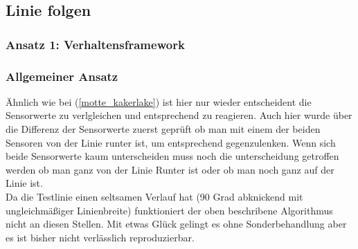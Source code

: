 \subsection{Linie folgen}
\label{linie_folgen}

\subsubsection{Ansatz 1: Verhaltensframework}

\subsubsection{Allgemeiner Ansatz}

Ähnlich wie bei  (\ref{motte_kakerlake})  ist hier nur wieder entscheident die Sensorwerte zu verlgleichen und entsprechend zu reagieren. Auch hier wurde über die Differenz der Sensorwerte zuerst geprüft ob man mit einem der beiden Sensoren von der Linie runter ist, um entsprechend gegenzulenken. Wenn sich beide Sensorwerte kaum unterscheiden muss noch die unterscheidung getroffen werden ob man ganz von der Linie Runter ist oder ob man noch ganz auf der Linie ist.
\\
Da die Testlinie einen seltsamen Verlauf hat (90 Grad abknickend mit ungleichmäßiger Linienbreite) funktioniert der oben beschribene Algorithmus nicht an diesen Stellen. Mit etwas Glück gelingt es ohne Sonderbehandlung aber es ist bisher nicht verlässlich reproduzierbar.

